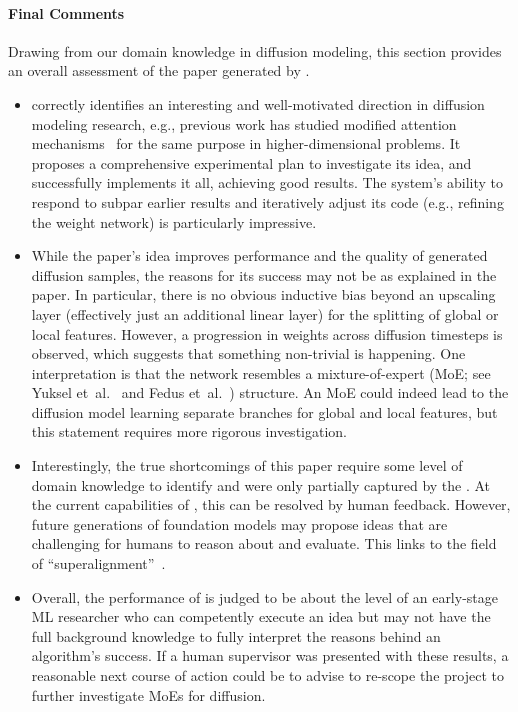 \begin{appendices}
\paragraph{Final Comments} Drawing from our domain knowledge in diffusion modeling, this section provides an overall assessment of the paper generated by \ouralgo.
\begin{itemize}
    \item \ouralgo correctly identifies an interesting and well-motivated direction in diffusion modeling research, e.g., previous work has studied modified attention mechanisms~\citep{hatamizadeh2024diffitdiffusionvisiontransformers} for the same purpose in higher-dimensional problems. It proposes a comprehensive experimental plan to investigate its idea, and successfully implements it all, achieving good results. The system's ability to respond to subpar earlier results and iteratively adjust its code (e.g., refining the weight network) is particularly impressive.
    \item While the paper's idea improves performance and the quality of generated diffusion samples, the reasons for its success may not be as explained in the paper. In particular, there is no obvious inductive bias beyond an upscaling layer (effectively just an additional linear layer) for the splitting of global or local features. However, a progression in weights across diffusion timesteps is observed, which suggests that something non-trivial is happening. One interpretation is that the network resembles a mixture-of-expert (MoE; see Yuksel et~al.~\citep{yuksel2012twenty} and Fedus et~al.~\citep{switch_transformer}) structure. An MoE could indeed lead to the diffusion model learning separate branches for global and local features, but this statement requires more rigorous investigation.
    \item Interestingly, the true shortcomings of this paper require some level of domain knowledge to identify and were only partially captured by the \ourreviewer. At the current capabilities of \ouralgo, this can be resolved by human feedback. However, future generations of foundation models may propose ideas that are challenging for humans to reason about and evaluate. This links to the field of ``superalignment''~\citep{burns2023weaktostronggeneralizationelicitingstrong}.
    \item Overall, the performance of \ouralgo is judged to be about the level of an early-stage ML researcher who can competently execute an idea but may not have the full background knowledge to fully interpret the reasons behind an algorithm's success. If a human supervisor was presented with these results, a reasonable next course of action could be to advise \ouralgo to re-scope the project to further investigate MoEs for diffusion.
\end{itemize}



\end{appendices}
